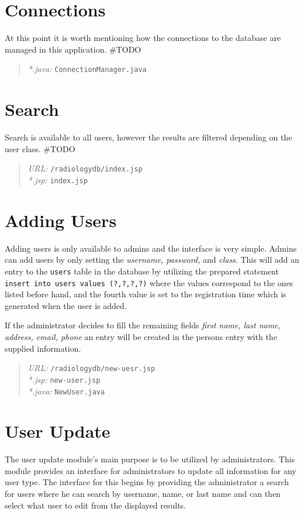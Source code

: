 \documentclass[11pt]{report}
\begin{document}
\section*{Connections}
At this point it is worth mentioning how the connections to the database are managed in this application. \#TODO

\begin{quote}
\emph{*.java: } \texttt{ConnectionManager.java}\\
\end{quote}
\section*{Search}
Search is available to all users, however the results are filtered depending on the user class. \#TODO

\begin{quote}
\emph{URL:} \texttt{/radiologydb/index.jsp} \\
\emph{*.jsp: } \texttt{index.jsp} \\
\end{quote}

\section*{Adding Users}
Adding users is only available to admins and the interface is very simple. Admins can add users by only setting the \emph{username, password,} and \emph{class}. This will add an entry to the \texttt{users} table in the database by utilizing the prepared statement \texttt{insert into users values (?,?,?,?)} where the values correspond to the ones listed before hand, and the fourth value is set to the registration time which is generated when the user is added.

If the administrator decides to fill the remaining fields \emph{first name, last name, address, email, phone} an entry will be created in the persons entry with the supplied information.

\begin{quote}
\emph{URL:} \texttt{/radiologydb/new-uesr.jsp} \\
\emph{*.jsp: } \texttt{new-user.jsp} \\
\emph{*.java: } \texttt{NewUser.java}
\end{quote}

\section*{User Update}
The user update module's main purpose is to be utilized by administrators. This module provides an interface for administrators to update all information for any user type. The interface for this begins by providing the administrator a search for users where he can search by username, name, or last name and can then select what user to edit from the displayed results.
\end{document}
